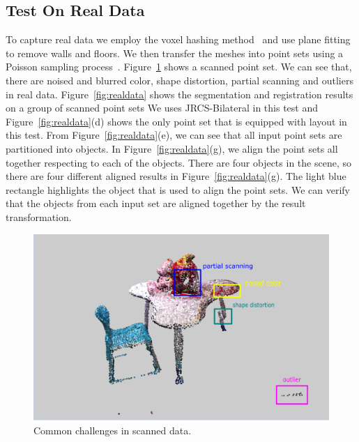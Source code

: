 \subsection{Test On Real Data}
To capture real data we employ the voxel hashing method~\cite{VXH} and use plane fitting to remove walls and floors. 
%
We then transfer the meshes into point sets using a Poisson sampling process~\cite{PossionSampling}.
%
Figure~\ref{fig:challenge} shows a scanned point set. We can see that, there are noised and blurred color, shape distortion, partial scanning and outliers in real data.
%
Figure~\ref{fig:realdata} shows the segmentation and registration results on a group of scanned point sets We uses JRCS-Bilateral in this test and Figure~\ref{fig:realdata}(d) shows the only point set that is equipped with layout in this test.
From Figure~\ref{fig:realdata}(e), we can see that all input point sets are partitioned into objects. In Figure~\ref{fig:realdata}(g), we align the point sets all together respecting to each of the objects. There are four objects in the scene, so there are four different aligned results in Figure~\ref{fig:realdata}(g). The light blue rectangle highlights the object that is used to align the point sets. We can verify that the objects from each input set are aligned together by the result transformation.
\begin{figure}
	\centering
	\includegraphics[width=\linewidth]{images/challenge/challenge}
	\caption{\label{fig:challenge}Common challenges in scanned data.}
\end{figure}
